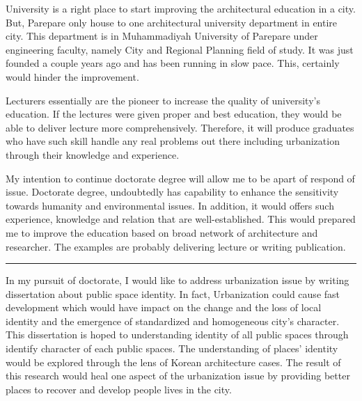 \documentclass[11pt]{simart} %
\begin{document}
University is a right place to start improving the architectural education in a city.
But, Parepare only house to one architectural university department in entire city.
This department is in Muhammadiyah University of Parepare under engineering faculty, namely City and Regional Planning field of study.
It was just founded a couple years ago and has been running in slow pace. This, certainly would hinder the improvement.

Lecturers essentially are the pioneer to increase the quality of university's education.
If the lectures were given proper and best education, they would be able to deliver lecture more comprehensively.
Therefore, it will produce graduates who have such skill handle any real problems out there including urbanization through their knowledge and experience.

My intention to continue doctorate degree will allow me to be apart of respond of issue.
Doctorate degree, undoubtedly has capability to enhance the sensitivity towards humanity and environmental issues.
In addition, it would offers such experience, knowledge and relation that are well-established.
This would prepared me to improve the education based on broad network of architecture and researcher. The examples are probably delivering lecture or writing publication.


\noindent\rule{\linewidth}{0.5pt}
In my pursuit of doctorate, I would like to address urbanization issue by writing dissertation about public space identity. In fact, Urbanization  could cause fast development which would have impact on the change and the loss of local identity and the emergence of standardized and homogeneous city's character.  This dissertation is hoped to understanding identity of all public spaces through identify character of each public spaces. The understanding of places' identity would be explored through the lens of Korean architecture cases. The result of this research would heal one aspect of the urbanization issue by providing better places to recover and develop people lives in the city.
\end{document}
